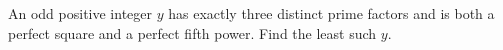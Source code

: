 An odd positive integer $y$ has exactly three distinct prime factors and is both a perfect square and a perfect fifth power. Find the least such $y$.
